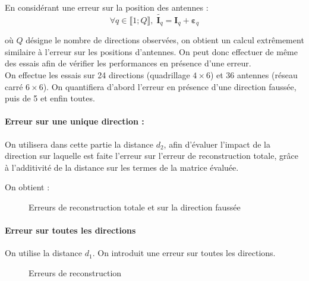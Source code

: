 \documentclass[titlepage]{article}
\begin{document}
	En considérant une erreur sur la position des antennes :
	\begin{equation}
		\forall q\in \llbracket 1;Q\rrbracket,\; \widetilde{\boldsymbol{I}_q} = \boldsymbol{I}_q + \boldsymbol{\varepsilon}_q
	\end{equation}
	
	où $Q$ désigne le nombre de directions observées, on obtient un calcul extrêmement similaire à l'erreur sur les positions d'antennes. On peut donc effectuer de même des essais afin de vérifier les performances en présence d'une erreur. \\
	On effectue les essais sur 24 directions (quadrillage $4\times6$) et 36 antennes (réseau carré $6\times6$). On quantifiera d'abord l'erreur en présence d'une direction faussée, puis de 5 et enfin toutes. \\
	
	\paragraph{Erreur sur une unique direction :} 
	On utilisera dans cette partie la distance $d_2$, afin d'évaluer l'impact de la direction sur laquelle est faite l'erreur sur l'erreur de reconstruction totale, grâce à l'additivité de la distance sur les termes de la matrice évaluée.
	
	On obtient :
	
	\begin{figure}[H]
		\centering
		
		\caption{Erreurs de reconstruction totale et sur la direction faussée}
	\end{figure}

	\paragraph{Erreur sur toutes les directions}
	On utilise la distance $d_1$. On introduit une erreur sur toutes les directions.
	
	\begin{figure}[H]
		\centering
		
		\caption{Erreurs de reconstruction}
	\end{figure}
	
	
\end{document}
